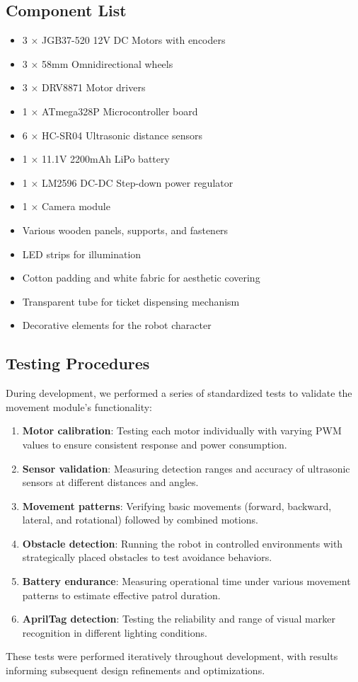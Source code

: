 \subsection{Component List}

\begin{itemize}
    \item 3 × JGB37-520 12V DC Motors with encoders
    \item 3 × 58mm Omnidirectional wheels
    \item 3 × DRV8871 Motor drivers
    \item 1 × ATmega328P Microcontroller board
    \item 6 × HC-SR04 Ultrasonic distance sensors
    \item 1 × 11.1V 2200mAh LiPo battery
    \item 1 × LM2596 DC-DC Step-down power regulator
    \item 1 × Camera module
    \item Various wooden panels, supports, and fasteners
    \item LED strips for illumination
    \item Cotton padding and white fabric for aesthetic covering
    \item Transparent tube for ticket dispensing mechanism
    \item Decorative elements for the robot character
\end{itemize}

\subsection{Testing Procedures}

During development, we performed a series of standardized tests to validate the movement module's functionality:

\begin{enumerate}
    \item \textbf{Motor calibration}: Testing each motor individually with varying PWM values to ensure consistent response and power consumption.
    \item \textbf{Sensor validation}: Measuring detection ranges and accuracy of ultrasonic sensors at different distances and angles.
    \item \textbf{Movement patterns}: Verifying basic movements (forward, backward, lateral, and rotational) followed by combined motions.
    \item \textbf{Obstacle detection}: Running the robot in controlled environments with strategically placed obstacles to test avoidance behaviors.
    \item \textbf{Battery endurance}: Measuring operational time under various movement patterns to estimate effective patrol duration.
    \item \textbf{AprilTag detection}: Testing the reliability and range of visual marker recognition in different lighting conditions.
\end{enumerate}

These tests were performed iteratively throughout development, with results informing subsequent design refinements and optimizations.
